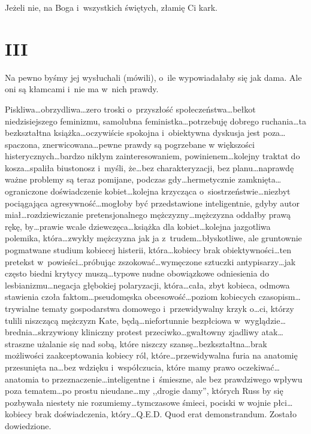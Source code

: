 \documentclass[oneside,polish,12pt,sfheadings]{mwbk}
\begin{document}
Jeżeli nie, na Boga i~wszystkich świętych, złamię Ci kark.

\chapter{III}

Na pewno byśmy jej wysłuchali (mówili), o~ile wypowiadałaby się jak
dama. Ale oni są kłamcami i~nie ma w~nich prawdy.

Piskliwa\ldots obrzydliwa\ldots zero troski o~przyszłość społeczeństwa\ldots bełkot
niedzisiejszego feminizmu, samolubna feministka\ldots potrzebuję dobrego
ruchania\ldots ta bezkształtna książka\ldots oczywiście spokojna i~obiektywna
dyskusja jest poza\ldots spaczona, znerwicowana\ldots pewne prawdy są pogrzebane
w większości histerycznych\ldots bardzo nikłym zainteresowaniem, powinienem\ldots kolejny traktat do kosza\ldots spaliła biustonosz i~myśli, że\ldots  bez charakteryzacji,
bez planu\ldots  naprawdę ważne problemy są teraz pomijane, podczas gdy\ldots  hermetycznie
zamknięta\ldots  ograniczone doświadczenie kobiet\ldots  kolejna krzycząca o~siostrzeństwie\ldots  niezbyt pociągająca agresywność\ldots  mogłoby być przedstawione
inteligentnie, gdyby autor miał\ldots  rozdziewiczanie pretensjonalnego
mężczyzny\ldots  mężczyzna oddałby prawą rękę, by\ldots  prawie wcale dziewczęca\ldots  książka
dla kobiet\ldots  kolejna jazgotliwa polemika, która\ldots  zwykły mężczyzna
jak ja z~trudem\ldots błyskotliwe, ale gruntownie pogmatwane studium kobiecej
histerii, która\ldots kobiecy brak obiektywności\ldots ten pretekst w~powieści\ldots próbując
zszokować\ldots wymęczone sztuczki antypisarzy\ldots jak często biedni krytycy
muszą\ldots typowe nudne obowiązkowe odniesienia do lesbianizmu\ldots negacja
głębokiej polaryzacji, która\ldots cała, zbyt kobieca, odmowa stawienia
czoła faktom\ldots pseudomęska obcesowość\ldots poziom kobiecych czasopism\ldots trywialne
tematy gospodarstwa domowego i~przewidywalny krzyk o\ldots ci, którzy
tulili niszczącą mężczyzn Kate, będą\ldots niefortunnie bezpłciowa w~wyglądzie\ldots brednia\ldots skrzywiony
kliniczny protest przeciwko\ldots gwałtowny zjadliwy atak\ldots straszne użalanie
się nad sobą, które niszczy szansę\ldots bezkształtna\ldots brak możliwości
zaakceptowania kobiecy ról, które\ldots przewidywalna furia na anatomię
przesunięta na\ldots bez wdzięku i~współczucia, które mamy prawo oczekiwać\ldots anatomia
to przeznaczenie\ldots inteligentne i~śmieszne, ale bez prawdziwego wpływu
poza tematem\ldots po prostu nieudane\ldots my ,,drogie damy'', których Russ
by się pozbywała niestety nie rozumiemy\ldots tymczasowe śmieci, pociski
w wojnie płci\ldots kobiecy brak doświadczenia, który\ldots Q.E.D. Quod erat
demonstrandum. Zostało dowiedzione.
\end{document}
